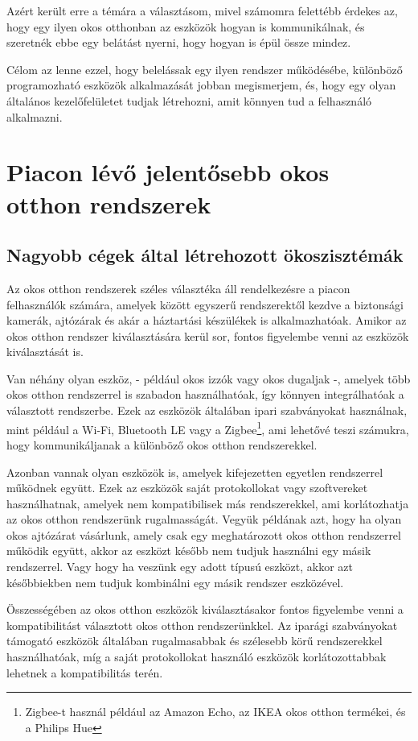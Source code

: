\documentclass[
]{thesis-ekf}
\theoremstyle{definition}
\theoremstyle{remark}
\begin{document}
	Azért került erre a témára a választásom, mivel számomra felettébb érdekes az, hogy egy ilyen okos otthonban az eszközök hogyan is kommunikálnak, és szeretnék ebbe egy belátást nyerni, hogy hogyan is épül össze mindez.

	Célom az lenne ezzel, hogy belelássak egy ilyen rendszer működésébe, különböző programozható eszközök alkalmazását jobban megismerjem, és, hogy egy olyan általános kezelőfelületet tudjak létrehozni, amit könnyen tud a felhasználó alkalmazni.
	
	\chapter{Piacon lévő jelentősebb okos otthon rendszerek}
	\section{Nagyobb cégek által létrehozott ökoszisztémák}
	Az okos otthon rendszerek széles választéka áll rendelkezésre a piacon felhasználók számára, amelyek között egyszerű rendszerektől kezdve a biztonsági kamerák, ajtózárak és akár a háztartási készülékek is alkalmazhatóak. Amikor az okos otthon rendszer kiválasztására kerül sor, fontos figyelembe venni az eszközök kiválasztását is.
	
	Van néhány olyan eszköz, - például okos izzók vagy okos dugaljak -, amelyek több okos otthon rendszerrel is szabadon használhatóak, így könnyen integrálhatóak a választott rendszerbe. Ezek az eszközök általában ipari szabványokat használnak, mint például a Wi-Fi, Bluetooth LE vagy a Zigbee\footnote{Zigbee-t használ például az Amazon Echo, az IKEA okos otthon termékei, és a Philips Hue}, ami lehetővé teszi számukra, hogy kommunikáljanak a különböző okos otthon rendszerekkel. 
	
	Azonban vannak olyan eszközök is, amelyek kifejezetten egyetlen rendszerrel működnek együtt. Ezek az eszközök saját protokollokat vagy szoftvereket használhatnak, amelyek nem kompatibilisek más rendszerekkel, ami korlátozhatja az okos otthon rendszerünk rugalmasságát. Vegyük példának azt, hogy ha olyan okos ajtózárat vásárlunk, amely csak egy meghatározott okos otthon rendszerrel működik együtt, akkor az eszközt később nem tudjuk használni egy másik rendszerrel. Vagy hogy ha veszünk egy adott típusú eszközt, akkor azt későbbiekben nem tudjuk kombinálni egy másik rendszer eszközével.
	
	Összességében az okos otthon eszközök kiválasztásakor fontos figyelembe venni a kompatibilitást választott okos otthon rendszerünkkel. Az iparági szabványokat támogató eszközök általában rugalmasabbak és szélesebb körű rendszerekkel használhatóak, míg a saját protokollokat használó eszközök korlátozottabbak lehetnek a kompatibilitás terén.
		
\end{document}
